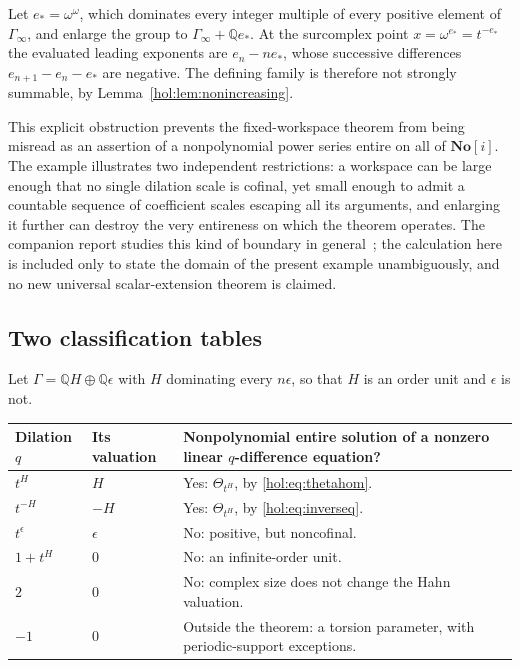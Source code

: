 \documentclass[11pt]{article}
\numberwithin{equation}{section}
\theoremstyle{definition}
\theoremstyle{remark}
\newcommand{\Q}{\mathbb Q}
\newcommand{\No}{\mathbf{No}}
\begin{document}
Let $e_\ast=\omega^\omega$, which dominates every integer multiple of every
positive element of $\Gamma_\infty$, and enlarge the group to
$\Gamma_\infty+\Q e_\ast$. At the surcomplex point $x=\omega^{e_\ast}
=t^{-e_\ast}$ the evaluated leading exponents are $e_n-ne_\ast$, whose
successive differences $e_{n+1}-e_n-e_\ast$ are negative. The defining family
is therefore not strongly summable, by
Lemma~\ref{hol:lem:nonincreasing}.

This explicit obstruction prevents the fixed-workspace theorem from being
misread as an assertion of a nonpolynomial power series entire on all of
$\No[i]$. The example illustrates two independent restrictions: a workspace
can be large enough that no single dilation scale is cofinal, yet small enough
to admit a countable sequence of coefficient scales escaping all its
arguments, and enlarging it further can destroy the very entireness on which
the theorem operates. The companion report studies this kind of boundary in
general~\cite{repoentire}; the calculation here is included only to state the
domain of the present example unambiguously, and no new universal
scalar-extension theorem is claimed.

\subsection{Two classification tables}\label{hol:sub:tables}

Let $\Gamma=\Q H\oplus\Q\epsilon$ with $H$ dominating every $n\epsilon$, so
that $H$ is an order unit and $\epsilon$ is not.

\begin{center}
\begin{tabularx}{\textwidth}{@{}l l X@{}}
\toprule
Dilation $q$ & Its valuation & Nonpolynomial entire solution of a nonzero
linear $q$-difference equation?\\
\midrule
$t^H$ & $H$ & Yes: $\Theta_{t^H}$, by \eqref{hol:eq:thetahom}.\\
$t^{-H}$ & $-H$ & Yes: $\Theta_{t^{H}}$, by \eqref{hol:eq:inverseq}.\\
$t^\epsilon$ & $\epsilon$ & No: positive, but noncofinal.\\
$1+t^H$ & $0$ & No: an infinite-order unit.\\
$2$ & $0$ & No: complex size does not change the Hahn valuation.\\
$-1$ & $0$ & Outside the theorem: a torsion parameter, with
periodic-support exceptions.\\
\bottomrule
\end{tabularx}
\end{center}
\end{document}

